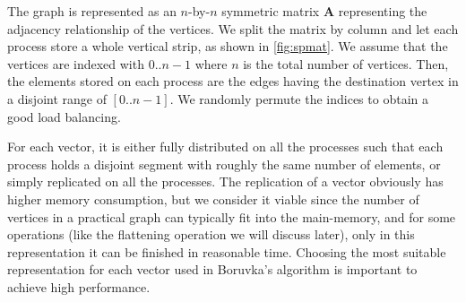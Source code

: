 \documentclass{sokendai_thesis} %
\newcommand{\boruvka}[0]{Boruvka}
\begin{document}
The graph is represented as an $n$-by-$n$ symmetric matrix $\mathbf{A}$ representing the adjacency relationship of the vertices.
We split the matrix by column and let each process store a whole vertical strip, as shown in \autoref{fig:spmat}.
We assume that the vertices are indexed with $0..n-1$ where $n$ is the total number of vertices.
Then, the elements stored on each process are the edges having the destination vertex in a disjoint range of $[0..n-1]$.
We randomly permute the indices to obtain a good load balancing.

For each vector, it is either fully distributed on all the processes such that each process holds a disjoint segment with roughly the same number of elements, or simply replicated on all the processes.
The replication of a vector obviously has higher memory consumption, but we consider it viable since the number of vertices in a practical graph can typically fit into the main-memory, and for some operations (like the flattening operation we will discuss later), only in this representation it can be finished in reasonable time.
Choosing the most suitable representation for each vector used in \boruvka{}'s algorithm is important to achieve high performance.

\end{document}
